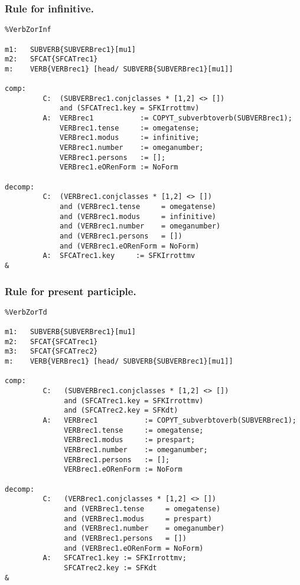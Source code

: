 \subsubsection{Rule for infinitive.}
\begin{verbatim}
%VerbZorInf 

m1:   SUBVERB{SUBVERBrec1}[mu1]
m2:   SFCAT{SFCATrec1}
m:    VERB{VERBrec1} [head/ SUBVERB{SUBVERBrec1}[mu1]]

comp:
         C:  (SUBVERBrec1.conjclasses * [1,2] <> [])
             and (SFCATrec1.key = SFKIrrottmv)
         A:  VERBrec1           := COPYT_subverbtoverb(SUBVERBrec1);
             VERBrec1.tense     := omegatense;
             VERBrec1.modus     := infinitive;
             VERBrec1.number    := omeganumber;
             VERBrec1.persons   := [];
             VERBrec1.eORenForm := NoForm

decomp:
         C:  (VERBrec1.conjclasses * [1,2] <> [])
             and (VERBrec1.tense     = omegatense) 
             and (VERBrec1.modus     = infinitive)
             and (VERBrec1.number    = omeganumber)
             and (VERBrec1.persons   = [])
             and (VERBrec1.eORenForm = NoForm)
         A:  SFCATrec1.key     := SFKIrrottmv
&
\end{verbatim}
\newpage
\subsubsection{Rule for present participle.}
\begin{verbatim}
%VerbZorTd

m1:   SUBVERB{SUBVERBrec1}[mu1]
m2:   SFCAT{SFCATrec1}
m3:   SFCAT{SFCATrec2}
m:    VERB{VERBrec1} [head/ SUBVERB{SUBVERBrec1}[mu1]]

comp:
         C:   (SUBVERBrec1.conjclasses * [1,2] <> []) 
              and (SFCATrec1.key = SFKIrrottmv)
              and (SFCATrec2.key = SFKdt)
         A:   VERBrec1           := COPYT_subverbtoverb(SUBVERBrec1);
              VERBrec1.tense     := omegatense;
              VERBrec1.modus     := prespart;
              VERBrec1.number    := omeganumber;
              VERBrec1.persons   := [];
              VERBrec1.eORenForm := NoForm

decomp:
         C:   (VERBrec1.conjclasses * [1,2] <> [])
              and (VERBrec1.tense     = omegatense) 
              and (VERBrec1.modus     = prespart)
              and (VERBrec1.number    = omeganumber)
              and (VERBrec1.persons   = [])
              and (VERBrec1.eORenForm = NoForm)
         A:   SFCATrec1.key := SFKIrrottmv;
              SFCATrec2.key := SFKdt
&
\end{verbatim}
\newpage

